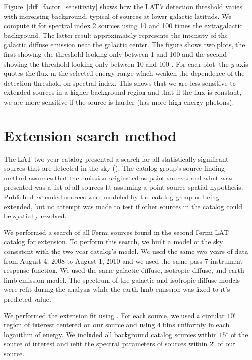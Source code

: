 \documentclass[12pt,preprint]{aastex}
\newcommand{\gev}{\text{GeV}\xspace}
\renewcommand{\deg}{\ensuremath{^\circ}\xspace}
\newcommand{\pointlike}{\text{\em pointlike}\xspace}
\begin{document}
Figure~\ref{diff_factor_sensitivity} shows how the LAT's
detection threshold varies with increasing background, typical of sources
at lower galactic latitude. We compute it for spectral
index 2 sources using 10 and 100 times the
extragalactic background. The latter result approximately represents the intensity of
the galactic diffuse emission near the galactic center. 
The figure shows two plots, the first showing the threshold looking only between 
1 \gev and 100 \gev and the second showing the threshold looking only
between 10 \gev and 100 \gev.
For each plot, the $y$ axis quotes the flux in the selected energy range
which weaken the dependence of the detection threshold on spectral index.
This shows that we are less sensitive to extended sources in
a higher background region and that if the flux is constant,
we are more sensitive if the source is harder (has more high energy
photons).

\section{Extension search method}


The LAT two year catalog presented a search for all
statistically significant sources that are detected in the \gev
sky (\cite{second_cat}).  The catalog group's source finding method assumes
that the emission originated as point sources and what was presented was
a list of all sources fit assuming a point source spatial hypothesis. 
Published extended sources were modeled by the catalog group as 
being extended, but no attempt was made to test if other sources in the catalog
could be spatially resolved.

We performed a search of all Fermi sources found in the second Fermi LAT
catalog for extension.  To perform this search, we built a model of the
sky consistent with the two year catalog's model.   We used the same two
years of data from August 4, 2008 to August 1, 2010 and we used the same
pass 7 instrument response function.  We used the same galactic diffuse,
isotropic diffuse, and earth limb emission model. The spectrum of the
galactic and isotropic diffuse models were refit during the analysis
while the earth limb emission was fixed to it's predicted value.

We performed the extension fit using \pointlike.  For each source, we
used a circular $10\deg$ region of interest centered on our source and
using 4 bins uniformly in each logarithm of energy.  We included all
background catalog sources within $15\deg$ of the source of interest
and refit the spectral parameters of sources within $2\deg$ of our source.
\end{document}
